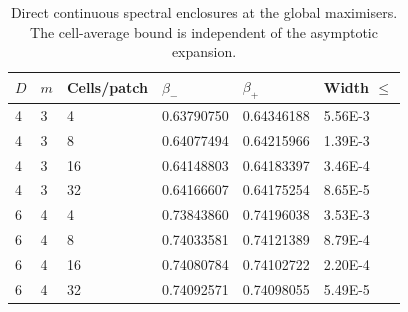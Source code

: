 \begin{table}[htbp]
\centering
\caption{Direct continuous spectral enclosures at the global maximisers. The cell-average bound is independent of the asymptotic expansion.}
\label{tab:peak_refinement}
\begin{tabular}{llllll}
\toprule
$D$ & $m$ & Cells/patch & $\beta_-$ & $\beta_+$ & Width $\leq$ \\
\midrule
4 & 3 & 4 & 0.63790750 & 0.64346188 & 5.56E-3 \\
4 & 3 & 8 & 0.64077494 & 0.64215966 & 1.39E-3 \\
4 & 3 & 16 & 0.64148803 & 0.64183397 & 3.46E-4 \\
4 & 3 & 32 & 0.64166607 & 0.64175254 & 8.65E-5 \\
6 & 4 & 4 & 0.73843860 & 0.74196038 & 3.53E-3 \\
6 & 4 & 8 & 0.74033581 & 0.74121389 & 8.79E-4 \\
6 & 4 & 16 & 0.74080784 & 0.74102722 & 2.20E-4 \\
6 & 4 & 32 & 0.74092571 & 0.74098055 & 5.49E-5 \\
\bottomrule
\end{tabular}
\end{table}
